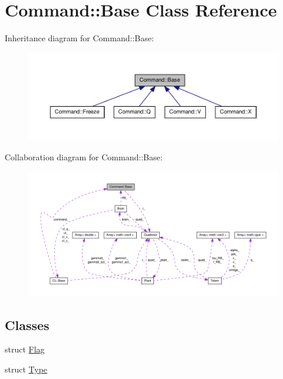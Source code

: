 \hypertarget{classCommand_1_1Base}{\section{\-Command\-:\-:\-Base \-Class \-Reference}
\label{classCommand_1_1Base}
}


\-Inheritance diagram for \-Command\-:\-:\-Base\-:\nopagebreak
\begin{figure}[H]
\begin{center}
\leavevmode
\includegraphics[width=350pt]{classCommand_1_1Base__inherit__graph}
\end{center}
\end{figure}


\-Collaboration diagram for \-Command\-:\-:\-Base\-:\nopagebreak
\begin{figure}[H]
\begin{center}
\leavevmode
\includegraphics[width=350pt]{classCommand_1_1Base__coll__graph}
\end{center}
\end{figure}
\subsection*{\-Classes}
\begin{DoxyCompactItemize}
\item 
struct \hyperlink{structCommand_1_1Base_1_1Flag}{\-Flag}
\item 
struct \hyperlink{structCommand_1_1Base_1_1Type}{\-Type}
\end{DoxyCompactItemize}
